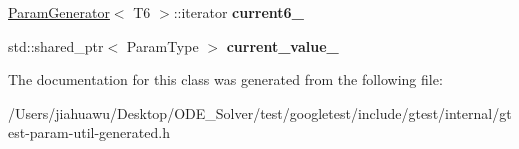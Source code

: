 \begin{DoxyCompactItemize}
\mbox{\hyperlink{classtesting_1_1internal_1_1_param_generator}{Param\+Generator}}$<$ T6 $>$\+::iterator {\bfseries current6\+\_\+}
\item 
\mbox{\label{classtesting_1_1internal_1_1_cartesian_product_generator6_1_1_iterator_ade02778a57fc9bddd4f374af3a1da0b3}} 
std\+::shared\+\_\+ptr$<$ Param\+Type $>$ {\bfseries current\+\_\+value\+\_\+}
\end{DoxyCompactItemize}


The documentation for this class was generated from the following file\+:\begin{DoxyCompactItemize}
\item 
/\+Users/jiahuawu/\+Desktop/\+O\+D\+E\+\_\+\+Solver/test/googletest/include/gtest/internal/gtest-\/param-\/util-\/generated.\+h\end{DoxyCompactItemize}
